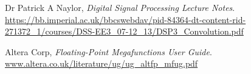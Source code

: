 \documentclass[]{article}
\begin{document}
\begin{thebibliography}{9}

	Dr Patrick A Naylor,
	\emph{Digital Signal Processing Lecture Notes}. \\
	\url{https://bb.imperial.ac.uk/bbcswebdav/pid-84364-dt-content-rid-271372_1/courses/DSS-EE3_07-12_13/DSP3_Convolution.pdf}

	Altera Corp,
	\emph{Floating-Point Megafunctions User Guide}. \\
	\url{www.altera.co.uk/literature/ug/ug_altfp_mfug.pdf}

\end{thebibliography}
\end{document}
